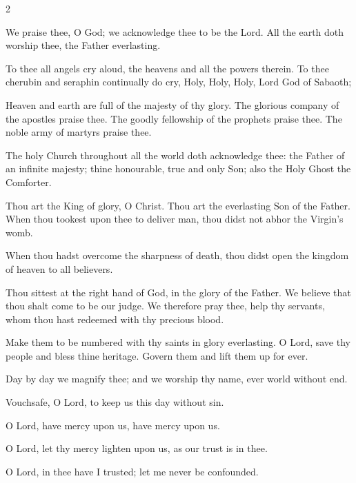 \begin{multicols}{2}
\raggedcolumns
\begin{enpars}

We praise thee, O God; we acknowledge thee to be the Lord.
All the earth doth worship thee, the Father everlasting.

To thee all angels cry aloud, the heavens and all the powers therein.
To thee cherubin and seraphin continually do cry,
Holy, Holy, Holy, Lord God of Sabaoth;

Heaven and earth are full of the majesty of thy glory.
The glorious company of the apostles praise thee.
The goodly fellowship of the prophets praise thee.
The noble army of martyrs praise thee.

The holy Church throughout all the world doth acknowledge thee:
the Father of an infinite majesty;
thine honourable, true and only Son;
also the Holy Ghost the Comforter.

Thou art the King of glory, O Christ.
Thou art the everlasting Son of the Father.
When thou tookest upon thee to deliver man,
thou didst not abhor the Virgin’s womb.

When thou hadst overcome the sharpness of death,
thou didst open the kingdom of heaven to all believers.

Thou sittest at the right hand of God, in the glory of the Father.
We believe that thou shalt come to be our judge.
We therefore pray thee, help thy servants,
whom thou hast redeemed with thy precious blood.

Make them to be numbered with thy saints in glory everlasting.
O Lord, save thy people and bless thine heritage.
Govern them and lift them up for ever.

Day by day we magnify thee;
and we worship thy name, ever world without end.

Vouchsafe, O Lord, to keep us this day without sin.

O Lord, have mercy upon us, have mercy upon us.

O Lord, let thy mercy lighten upon us, as our trust is in thee.

O Lord, in thee have I trusted; let me never be confounded.

\end{enpars}
\end{multicols}